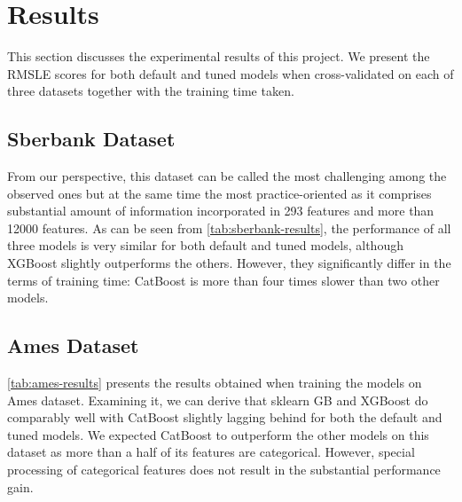\section{Results}
\label{sec:results}
This section discusses the experimental results of this project. We present the RMSLE scores for both default and tuned models when cross-validated on each of three datasets together with the training time taken.  

\subsection{Sberbank Dataset}
From our perspective, this dataset can be called the most challenging among the observed ones but at the same time the most practice-oriented as it comprises substantial amount of information incorporated in 293 features and more than 12000 features. As can be seen from \cref{tab:sberbank-results}, the performance of all three models is very similar for both default and tuned models, although XGBoost slightly outperforms the others. However, they significantly differ in the terms of training time: CatBoost is more than four times slower than two other models. 

\begin{table}[htbp]
	\centering
	\caption{Sberbank dataset: RMSLE,  best parameters for tuned model, training time. The best result in each column is highlighted in bold.}
	\label{tab:sberbank-results}
\end{table}

\subsection{Ames Dataset}
\cref{tab:ames-results} presents the results obtained when training the models on Ames dataset. Examining it, we can derive that sklearn GB and XGBoost do comparably well with CatBoost slightly lagging behind for both the default and tuned models. We expected CatBoost to outperform the other models on this dataset as more than a half of its features are categorical. However, special processing of categorical features does not result in the substantial performance gain.

